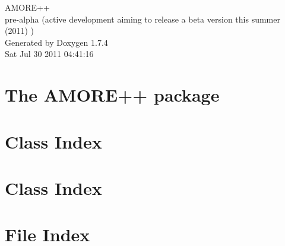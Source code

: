 \documentclass[a4paper]{book}
\begin{document}
\hypersetup{pageanchor=false}
\begin{titlepage}
\vspace*{7cm}
\begin{center}
{\Large AMORE++ \\[1ex]\large pre-\/alpha (active development aiming to release a beta version this summer (2011) ) }\\
\vspace*{1cm}
{\large Generated by Doxygen 1.7.4}\\
\vspace*{0.5cm}
{\small Sat Jul 30 2011 04:41:16}\\
\end{center}
\end{titlepage}
\clearemptydoublepage
{}
\tableofcontents
\clearemptydoublepage
{}
\hypersetup{pageanchor=true}
\chapter{The AMORE++ package}
\label{index}\hypertarget{index}{}
\chapter{Class Index}

\chapter{Class Index}

\chapter{File Index}

\end{document}
